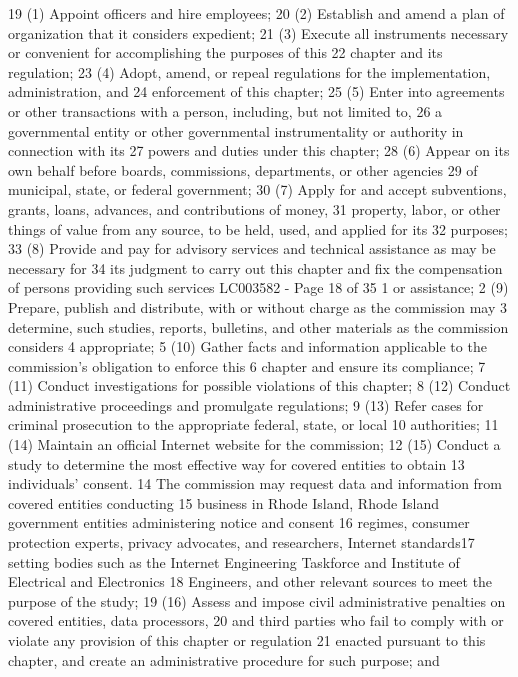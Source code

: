 19 (1) Appoint officers and hire employees;
20 (2) Establish and amend a plan of organization that it considers expedient;
21 (3) Execute all instruments necessary or convenient for accomplishing the purposes of this
22 chapter and its regulation;
23 (4) Adopt, amend, or repeal regulations for the implementation, administration, and
24 enforcement of this chapter;
25 (5) Enter into agreements or other transactions with a person, including, but not limited to,
26 a governmental entity or other governmental instrumentality or authority in connection with its
27 powers and duties under this chapter;
28 (6) Appear on its own behalf before boards, commissions, departments, or other agencies
29 of municipal, state, or federal government;
30 (7) Apply for and accept subventions, grants, loans, advances, and contributions of money,
31 property, labor, or other things of value from any source, to be held, used, and applied for its
32 purposes;
33 (8) Provide and pay for advisory services and technical assistance as may be necessary for
34 its judgment to carry out this chapter and fix the compensation of persons providing such services 
LC003582 - Page 18 of 35
1 or assistance;
2 (9) Prepare, publish and distribute, with or without charge as the commission may
3 determine, such studies, reports, bulletins, and other materials as the commission considers
4 appropriate;
5 (10) Gather facts and information applicable to the commission's obligation to enforce this
6 chapter and ensure its compliance;
7 (11) Conduct investigations for possible violations of this chapter;
8 (12) Conduct administrative proceedings and promulgate regulations;
9 (13) Refer cases for criminal prosecution to the appropriate federal, state, or local
10 authorities;
11 (14) Maintain an official Internet website for the commission;
12 (15) Conduct a study to determine the most effective way for covered entities to obtain
13 individuals’ consent.
14 The commission may request data and information from covered entities conducting
15 business in Rhode Island, Rhode Island government entities administering notice and consent
16 regimes, consumer protection experts, privacy advocates, and researchers, Internet standards17 setting bodies such as the Internet Engineering Taskforce and Institute of Electrical and Electronics
18 Engineers, and other relevant sources to meet the purpose of the study;
19 (16) Assess and impose civil administrative penalties on covered entities, data processors,
20 and third parties who fail to comply with or violate any provision of this chapter or regulation
21 enacted pursuant to this chapter, and create an administrative procedure for such purpose; and

